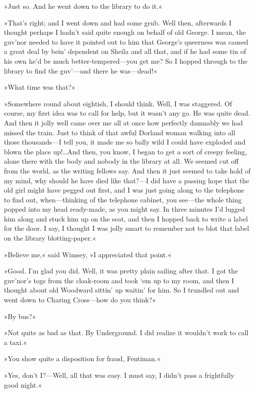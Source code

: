 »Just so. And he went down to the library to do it.«

»That's right; and I went down and had some grub. Well then, afterwards I thought perhaps I hadn't said quite enough on behalf of old George. I mean, the guv'nor needed to have it pointed out to him that George's queerness was caused a great deal by bein' dependent on Sheila and all that, and if he had some tin of his own he'd be much better-tempered—you get me? So I hopped through to the library to find the guv'—and there he was—dead!«

»What time was that?«

»Somewhere round about eightish, I should think. Well, I was staggered. Of course, my first idea was to call for help, but it wasn't any go. He was quite dead. And then it jolly well came over me all at once how perfectly damnably we had missed the train. Just to think of that awful Dorland woman walking into all those thousands—I tell you, it made me so bally wild I could have exploded and blown the place up!\dots And then, you know, I began to get a sort of creepy feeling, alone there with the body and nobody in the library at all. We seemed cut off from the world, as the writing fellows say. And then it just seemed to take hold of my mind, why should he have died like that?—I did have a passing hope that the old girl might have pegged out first, and I was just going along to the telephone to find out, when—thinking of the telephone cabinet, you see—the whole thing popped into my head ready-made, as you might say. In three minutes I'd lugged him along and stuck him up on the seat, and then I hopped back to write a label for the door. I say, I thought I was jolly smart to remember not to blot that label on the library blotting-paper.«

»Believe me,« said Wimsey, »I appreciated that point.«

»Good. I'm glad you did. Well, it was pretty plain sailing after that. I got the guv'nor's togs from the cloak-room and took `em up to my room, and then I thought about old Woodward sittin' up waitin' for him. So I trundled out and went down to Charing Cross—how do you think?«

»By bus?«

»Not quite as bad as that. By Underground. I did realize it wouldn't work to call a taxi.«

»You show quite a disposition for fraud, Fentiman.«

»Yes, don't I?—Well, all that was easy. I must say, I didn't pass a frightfully good night.«

